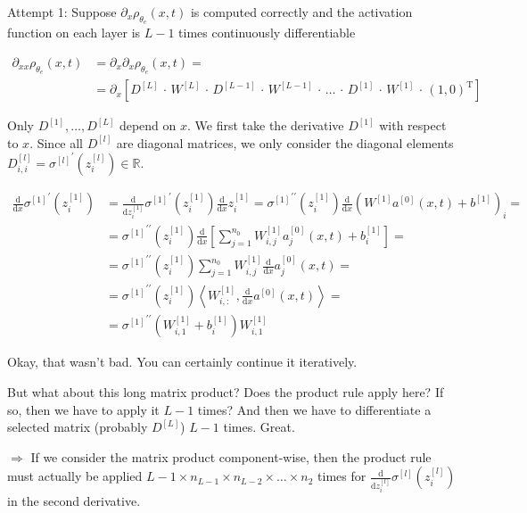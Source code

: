 Attempt 1: Suppose $\partial_x \rho_{\theta_e}(x, t)$ is computed correctly and the activation function on each layer is $L-1$ times continuously differentiable

\begin{align*}
    \partial_{x x} \rho_{\theta_e}(x, t) & = \partial_{x} \partial_{x} \rho_{\theta_e}(x, t) = \\
    & = \partial_{x} [D^{[L]} \, \cdot \, W^{[L]} \, \cdot \, D^{[L-1]} \, \cdot \, W^{[L-1]} \, \cdot \, \ldots \, \cdot \, D^{[1]} \, \cdot \, W^{[1]} \, \cdot \, (1, 0)^{\mathrm{T}}]
\end{align*}

Only $D^{[1]}, \ldots, D^{[L]}$ depend on $x$. We first take the derivative $D^{[1]}$ with respect to $x$. Since all $D^{[l]}$ are diagonal matrices, we only consider the diagonal elements $D_{i, i}^{[l]} = {\sigma^{[l]}}^{\prime} (z_{i}^{[l]}) \in \mathbb{R}$.  

\begin{align*}
    \frac{\mathrm{d}}{\mathrm{d} x} {\sigma^{[1]}}^{\prime} (z_{i}^{[1]}) & = \frac{\mathrm{d}}{\mathrm{d} z_{i}^{[1]}} {\sigma^{[1]}}^{\prime} (z_{i}^{[1]}) \frac{\mathrm{d}}{\mathrm{d} x} z_{i}^{[1]} = {\sigma^{[1]}}^{\prime \prime} (z_{i}^{[1]}) \frac{\mathrm{d}}{\mathrm{d} x} (W^{[1]} a^{[0]}(x,t) + b^{[1]})_i = \\
    & = {\sigma^{[1]}}^{\prime \prime} (z_{i}^{[1]}) \frac{\mathrm{d}}{\mathrm{d} x} \left[ \sum^{n_0}_{j=1} W^{[1]}_{i,j} a^{[0]}_{j}(x,t) + b^{[1]}_i \right] = \\
    & = {\sigma^{[1]}}^{\prime \prime} (z_{i}^{[1]}) \sum^{n_0}_{j=1} W^{[1]}_{i,j} \frac{\mathrm{d}}{\mathrm{d} x} a^{[0]}_{j}(x,t) = \\
    & = {\sigma^{[1]}}^{\prime \prime} (z_{i}^{[1]}) \left\langle W^{[1]}_{i, \colon}, \frac{\mathrm{d}}{\mathrm{d} x} a^{[0]}(x,t)  \right\rangle = \\
    & = {\sigma^{[1]}}^{\prime \prime} (W^{[1]}_{i, 1} + b^{[1]}_i) W^{[1]}_{i, 1}
\end{align*}

Okay, that wasn't bad. You can certainly continue it iteratively. 

But what about this long matrix product? Does the product rule apply here? If so, then we have to apply it $L-1$ times? And then we have to differentiate a selected matrix (probably $D^{[L]}$) $L-1$ times. Great.

$\Rightarrow$ If we consider the matrix product component-wise, then the product rule must actually be applied $L-1 \times n_{L-1} \times n_{L-2} \times \ldots \times n_{2}$ times for $\frac{\mathrm{d}}{\mathrm{d} z^{[l]}_i} \sigma^{[l]}(z^{[l]}_i)$ in the second derivative.  


